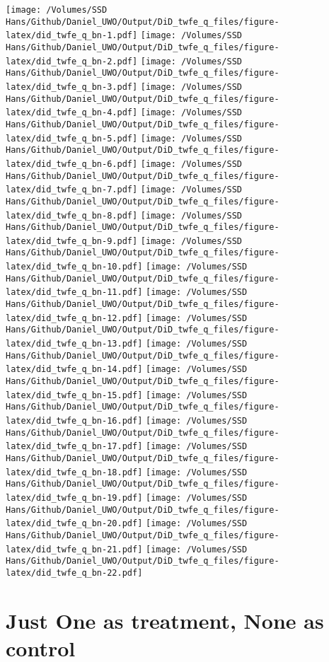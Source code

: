 \documentclass[
]{article}
\begin{document}
\texttt{[image: /Volumes/SSD Hans/Github/Daniel\_UWO/Output/DiD\_twfe\_q\_files/figure-latex/did\_twfe\_q\_bn-1.pdf]}
\texttt{[image: /Volumes/SSD Hans/Github/Daniel\_UWO/Output/DiD\_twfe\_q\_files/figure-latex/did\_twfe\_q\_bn-2.pdf]}
\texttt{[image: /Volumes/SSD Hans/Github/Daniel\_UWO/Output/DiD\_twfe\_q\_files/figure-latex/did\_twfe\_q\_bn-3.pdf]}
\texttt{[image: /Volumes/SSD Hans/Github/Daniel\_UWO/Output/DiD\_twfe\_q\_files/figure-latex/did\_twfe\_q\_bn-4.pdf]}
\texttt{[image: /Volumes/SSD Hans/Github/Daniel\_UWO/Output/DiD\_twfe\_q\_files/figure-latex/did\_twfe\_q\_bn-5.pdf]}
\texttt{[image: /Volumes/SSD Hans/Github/Daniel\_UWO/Output/DiD\_twfe\_q\_files/figure-latex/did\_twfe\_q\_bn-6.pdf]}
\texttt{[image: /Volumes/SSD Hans/Github/Daniel\_UWO/Output/DiD\_twfe\_q\_files/figure-latex/did\_twfe\_q\_bn-7.pdf]}
\texttt{[image: /Volumes/SSD Hans/Github/Daniel\_UWO/Output/DiD\_twfe\_q\_files/figure-latex/did\_twfe\_q\_bn-8.pdf]}
\texttt{[image: /Volumes/SSD Hans/Github/Daniel\_UWO/Output/DiD\_twfe\_q\_files/figure-latex/did\_twfe\_q\_bn-9.pdf]}
\texttt{[image: /Volumes/SSD Hans/Github/Daniel\_UWO/Output/DiD\_twfe\_q\_files/figure-latex/did\_twfe\_q\_bn-10.pdf]}
\texttt{[image: /Volumes/SSD Hans/Github/Daniel\_UWO/Output/DiD\_twfe\_q\_files/figure-latex/did\_twfe\_q\_bn-11.pdf]}
\texttt{[image: /Volumes/SSD Hans/Github/Daniel\_UWO/Output/DiD\_twfe\_q\_files/figure-latex/did\_twfe\_q\_bn-12.pdf]}
\texttt{[image: /Volumes/SSD Hans/Github/Daniel\_UWO/Output/DiD\_twfe\_q\_files/figure-latex/did\_twfe\_q\_bn-13.pdf]}
\texttt{[image: /Volumes/SSD Hans/Github/Daniel\_UWO/Output/DiD\_twfe\_q\_files/figure-latex/did\_twfe\_q\_bn-14.pdf]}
\texttt{[image: /Volumes/SSD Hans/Github/Daniel\_UWO/Output/DiD\_twfe\_q\_files/figure-latex/did\_twfe\_q\_bn-15.pdf]}
\texttt{[image: /Volumes/SSD Hans/Github/Daniel\_UWO/Output/DiD\_twfe\_q\_files/figure-latex/did\_twfe\_q\_bn-16.pdf]}
\texttt{[image: /Volumes/SSD Hans/Github/Daniel\_UWO/Output/DiD\_twfe\_q\_files/figure-latex/did\_twfe\_q\_bn-17.pdf]}
\texttt{[image: /Volumes/SSD Hans/Github/Daniel\_UWO/Output/DiD\_twfe\_q\_files/figure-latex/did\_twfe\_q\_bn-18.pdf]}
\texttt{[image: /Volumes/SSD Hans/Github/Daniel\_UWO/Output/DiD\_twfe\_q\_files/figure-latex/did\_twfe\_q\_bn-19.pdf]}
\texttt{[image: /Volumes/SSD Hans/Github/Daniel\_UWO/Output/DiD\_twfe\_q\_files/figure-latex/did\_twfe\_q\_bn-20.pdf]}
\texttt{[image: /Volumes/SSD Hans/Github/Daniel\_UWO/Output/DiD\_twfe\_q\_files/figure-latex/did\_twfe\_q\_bn-21.pdf]}
\texttt{[image: /Volumes/SSD Hans/Github/Daniel\_UWO/Output/DiD\_twfe\_q\_files/figure-latex/did\_twfe\_q\_bn-22.pdf]}

\hypertarget{just-one-as-treatment-none-as-control}{%
\section{Just One as treatment, None as
control}\label{just-one-as-treatment-none-as-control}}
\end{document}
